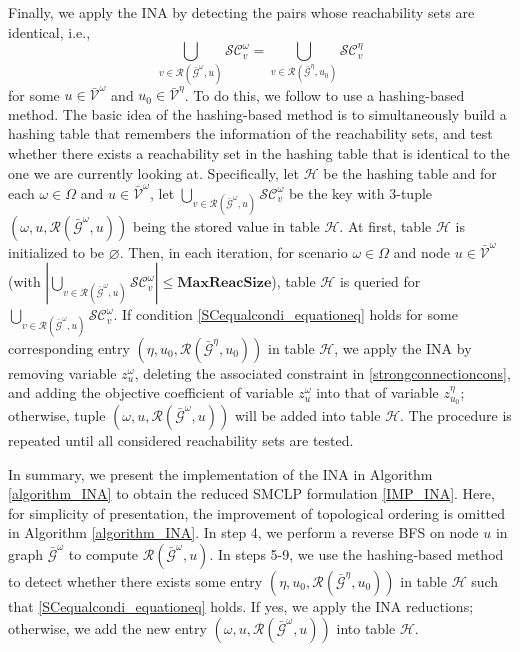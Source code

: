 \documentclass[a4paper,10pt]{article}
\newcommand{\maxlength}{\mathbf{MaxReacSize}}
\theoremstyle{plain}
\newcommand{\revv}[1]{{#1}}
\begin{document}
{	
	Finally, we apply the INA by detecting the pairs whose reachability sets are identical, i.e.,
	\begin{equation}\label{SCequalcondi_equationeq}
		\bigcup_{v\in\mathcal{R}(\bar{\mathcal{G}}^{\omega},u)}\mathcal{SC}^{\omega}_v=\bigcup_{v\in\mathcal{R}(\bar{\mathcal{G}}^{\revv{\eta}},u_0)}\mathcal{SC}^{\revv{\eta}}_v
	\end{equation}
	for some $u\in \mathcal{\bar{V}}^\omega$ and $ u_0 \in \mathcal{\bar{V}}^{\revv{\eta}}$.
	To do this, we follow \cite{Gurobipresolve} to use a hashing-based method.
	The basic idea of the hashing-based method is to simultaneously build a hashing table that remembers the information of the reachability sets\revv{,} and test whether there exists a reachability set in the hashing table that is identical to the one we are currently looking at.
	Specifically, let $\mathcal{H}$ be the hashing table and for each $\omega\in\Omega$ and $u\in\bar{\mathcal{V}}^{\omega}$,
	let
	$\bigcup_{v\in\mathcal{R}(\bar{\mathcal{G}}^{\omega},u)}\mathcal{SC}^{\omega}_v$
	be the key with 3-tuple $(\omega,u,\mathcal{R}(\bar{\mathcal{G}}^{\omega},u))$ being the stored value in table $\mathcal{H}$.
	At first, table $\mathcal{H}$ is initialized to be $\varnothing$.
	Then, in each iteration, for scenario $\omega\in\Omega$ and node $u\in\bar{\mathcal{V}}^{\omega}$ (with $|\bigcup_{v\in\mathcal{R}(\bar{\mathcal{G}}^{\omega},u)}\mathcal{SC}^{\omega}_v| \leq \maxlength$), table  $\mathcal{H}$ is queried for $\bigcup_{v\in\mathcal{R}(\bar{\mathcal{G}}^{\omega},u)}\mathcal{SC}^{\omega}_v$.
	If condition \eqref{SCequalcondi_equationeq} holds for some corresponding entry $(\revv{\eta}, u_0, \mathcal{R}(\bar{\mathcal{G}}^{\revv{\eta}},u_0))$ in table $\mathcal{H}$, we apply the INA by removing variable $z_u^\omega$, deleting the associated constraint in \eqref{strongconnectioncons}, and adding the objective coefficient of variable $z_u^\omega$ into that of variable $z_{u_0}^{\revv{\eta}}$; otherwise,  tuple $(\omega,u,\mathcal{R}(\bar{\mathcal{G}}^{\omega},u))$ will be added into table $\mathcal{H}$.
	The procedure is repeated until all considered reachability sets are tested.
	
	In summary, we present the implementation of the INA in Algorithm \ref{algorithm_INA} to obtain the reduced SMCLP formulation \eqref{IMP_INA}.
	Here, for simplicity of presentation, the improvement of topological ordering is omitted in Algorithm \ref{algorithm_INA}.
	In step 4, we perform a reverse BFS on node $u$ in graph $\mathcal{\bar{G}}^{\omega}$ to compute $\mathcal{R}(\bar{\mathcal{G}}^{\omega},u)$.
	In steps 5-9, we use the hashing-based method to detect whether there exists some entry $(\revv{\eta},u_0,\mathcal{R}(\bar{\mathcal{G}}^{\revv{\eta}},u_0))$ in table $\mathcal{H}$ such that \eqref{SCequalcondi_equationeq} holds.
	If yes, we apply the INA reductions; otherwise, we add the new entry $(\omega,u,\mathcal{R}(\bar{\mathcal{G}}^{\omega},u))$   into table $\mathcal{H}$.
	
}
\end{document}
